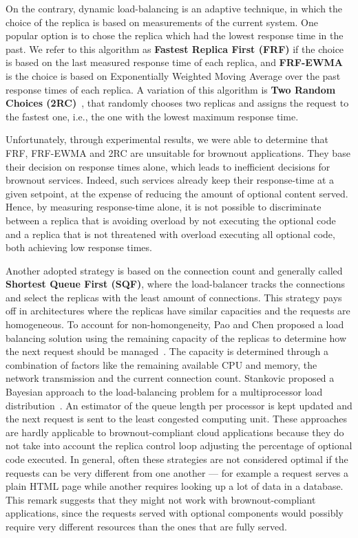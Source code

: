 On the contrary, dynamic load-balancing is an adaptive technique, in
which the choice of the replica is based on measurements of the current system.
One popular option is to chose the replica which had the lowest response time in the past.
We refer to this algorithm as \textbf{Fastest Replica First (FRF)} if the choice is based on the last
measured response time of each replica, and \textbf{FRF-EWMA} is the choice is based on
Exponentially Weighted Moving Average over the past response times of each replica.
A variation of this algorithm is \textbf{Two Random Choices
  (2RC)}~\cite{2RC}, that randomly chooses two replicas and
assigns the request to the fastest one, i.e., the one with the lowest
maximum response time.

Unfortunately, through experimental results, we were able to determine
that FRF, FRF-EWMA and 2RC are unsuitable for brownout applications. They base
their decision on response times alone, which
leads to inefficient decisions for brownout services.  Indeed, such
services already keep their response-time at a given setpoint, at the
expense of reducing the amount of optional content served. Hence, by
measuring response-time alone, it is not possible to discriminate
between a replica that is avoiding overload by not executing the
optional code and a replica that is not threatened with overload
executing all optional code, both achieving low response times.

Another adopted strategy is based on the connection count and
generally called \textbf{Shortest Queue First (SQF)}, where the
load-balancer tracks the connections and select the replicas with the
least amount of connections. This strategy pays off in architectures
where the replicas have similar capacities and the requests are
homogeneous. To account for non-homongeneity, Pao and Chen proposed a
load balancing solution using the remaining capacity of the replicas
to determine how the next request should be
managed~\cite{feedbackintensive}. The capacity is determined through a
combination of factors like the remaining available CPU and memory,
the network transmission and the current connection count. Stankovic
proposed a Bayesian approach to the load-balancing problem for a
multiprocessor load distribution~\cite{Stankovic:TC}. An estimator of
the queue length per processor is kept updated and the next request is
sent to the least congested computing unit. These approaches are
hardly applicable to brownout-compliant cloud applications because
they do not take into account the replica control loop adjusting the
percentage of optional code executed. In general, often these
strategies are not considered optimal if the requests can be very
different from one another --- for example a request serves a plain
HTML page while another requires looking up a lot of data in a
database. This remark suggests that they might not work with
brownout-compliant applications, since the requests served with
optional components would possibly require very different resources
than the ones that are fully served.

